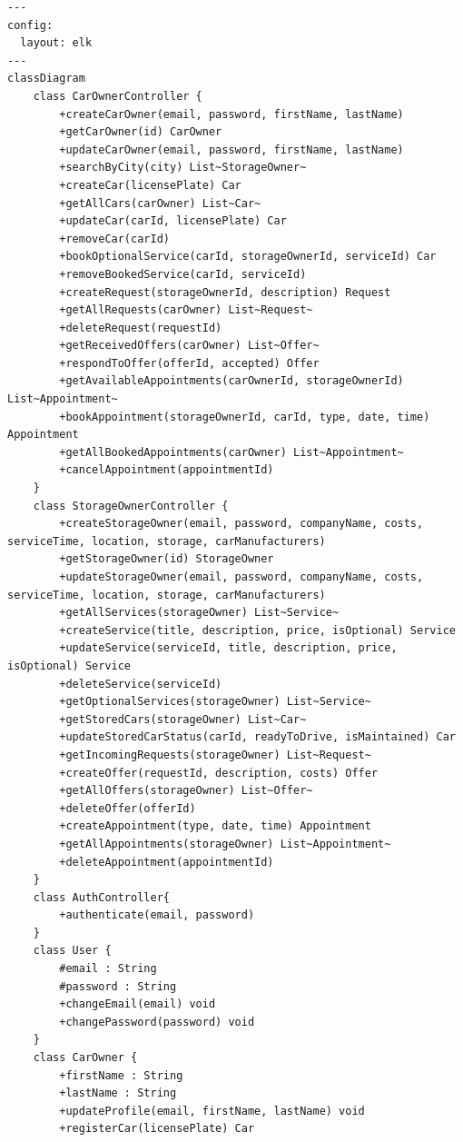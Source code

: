 \begin{lstlisting}[basicstyle=\ttfamily\small, breaklines=true]
---
config:
  layout: elk
---
classDiagram
    class CarOwnerController {
        +createCarOwner(email, password, firstName, lastName)
        +getCarOwner(id) CarOwner
        +updateCarOwner(email, password, firstName, lastName)
        +searchByCity(city) List~StorageOwner~
        +createCar(licensePlate) Car
        +getAllCars(carOwner) List~Car~
        +updateCar(carId, licensePlate) Car
        +removeCar(carId)
        +bookOptionalService(carId, storageOwnerId, serviceId) Car
        +removeBookedService(carId, serviceId)
        +createRequest(storageOwnerId, description) Request
        +getAllRequests(carOwner) List~Request~
        +deleteRequest(requestId)
        +getReceivedOffers(carOwner) List~Offer~
        +respondToOffer(offerId, accepted) Offer
        +getAvailableAppointments(carOwnerId, storageOwnerId) List~Appointment~
        +bookAppointment(storageOwnerId, carId, type, date, time) Appointment
        +getAllBookedAppointments(carOwner) List~Appointment~
        +cancelAppointment(appointmentId)
    }
    class StorageOwnerController {
        +createStorageOwner(email, password, companyName, costs, serviceTime, location, storage, carManufacturers)
        +getStorageOwner(id) StorageOwner
        +updateStorageOwner(email, password, companyName, costs, serviceTime, location, storage, carManufacturers)
        +getAllServices(storageOwner) List~Service~
        +createService(title, description, price, isOptional) Service
        +updateService(serviceId, title, description, price, isOptional) Service
        +deleteService(serviceId)
        +getOptionalServices(storageOwner) List~Service~
        +getStoredCars(storageOwner) List~Car~
        +updateStoredCarStatus(carId, readyToDrive, isMaintained) Car
        +getIncomingRequests(storageOwner) List~Request~
        +createOffer(requestId, description, costs) Offer
        +getAllOffers(storageOwner) List~Offer~
        +deleteOffer(offerId)
        +createAppointment(type, date, time) Appointment
        +getAllAppointments(storageOwner) List~Appointment~
        +deleteAppointment(appointmentId)
    }
    class AuthController{
        +authenticate(email, password)
    }
    class User {
        #email : String
        #password : String
        +changeEmail(email) void
        +changePassword(password) void
    }
    class CarOwner {
        +firstName : String
        +lastName : String
        +updateProfile(email, firstName, lastName) void
        +registerCar(licensePlate) Car

\end{lstlisting}
